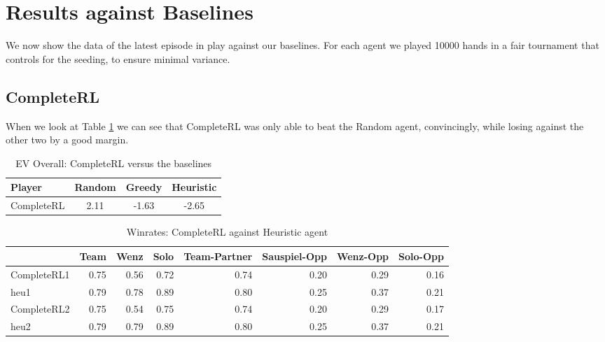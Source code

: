 \section{Results against Baselines}
We now show the data of the latest episode in play against our baselines.
For each agent we played 10000 hands in a fair tournament that controls for the seeding, to ensure minimal variance.

\subsection{CompleteRL}
When we look at Table \ref{tab:evCompleteRL} we can see that CompleteRL was only able to beat the Random agent,
convincingly, while losing against the other two by a good margin.\\
\newline
\begin{table}[!h]
    \centering
    \begin{tabular}{lccc}
        \toprule
        Player     & Random & Greedy & Heuristic \\
        \midrule
        CompleteRL & 2.11   & -1.63  & -2.65     \\
        \bottomrule
    \end{tabular}
    \caption{EV Overall: CompleteRL versus the baselines}
    \label{tab:evCompleteRL}
\end{table}

\begin{table}
    \begin{tabular}{lrrrrrrr}
        \toprule
        {}          & Team & Wenz & Solo & Team-Partner & Sauspiel-Opp & Wenz-Opp & Solo-Opp \\
        \midrule
        CompleteRL1 & 0.75 & 0.56 & 0.72 & 0.74         & 0.20         & 0.29     & 0.16     \\
        heu1        & 0.79 & 0.78 & 0.89 & 0.80         & 0.25         & 0.37     & 0.21     \\
        CompleteRL2 & 0.75 & 0.54 & 0.75 & 0.74         & 0.20         & 0.29     & 0.17     \\
        heu2        & 0.79 & 0.79 & 0.89 & 0.80         & 0.25         & 0.37     & 0.21     \\
        \bottomrule
    \end{tabular}
    \caption{Winrates: CompleteRL against Heuristic agent}
    \label{tab:heuCom}
\end{table}

